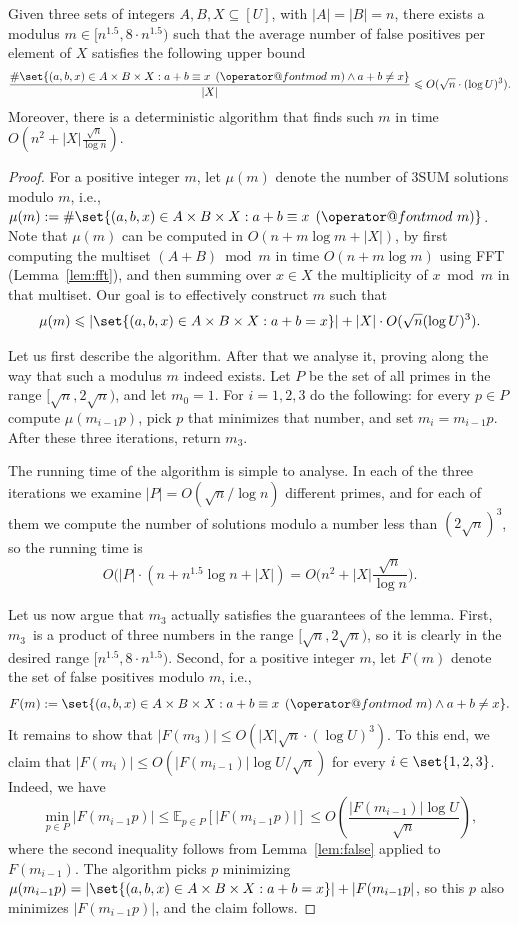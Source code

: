 \documentclass{theoretics}
\makeatletter
\newcommand{\E}{\mathbb{E}}
\newcommand{\tpmod}[1]{\mkern 8mu({\operator@font mod}\mkern 6mu#1)}
\makeatother
\begin{document}
\begin{lemma}
\label{lem:modulusselection}
Given three sets of integers $A, B, X \subseteq [U]$, with $|A|=|B|=n$, there exists a modulus $m \in [n^{1.5}, 8\cdot n^{1.5})$ such that the average number of false positives per element of $X$ satisfies the following upper bound
\[\frac{\#\set{(a,b,x) \in A \times B \times X : a + b \equiv x \tpmod{m} \land a + b \neq x}}{|X|} \leqslant O(\sqrt{n} \cdot (\log U)^3).\]
Moreover, there is a deterministic algorithm that finds such $m$ in time $O(n^2 + |X|\frac{\sqrt{n}}{\log n})$.
\end{lemma}

\begin{proof}
For a positive integer $m$, let $\mu(m)$ denote the number of 3SUM solutions modulo $m$, i.e.,
$\mu(m) := \#\set{(a,b,x) \in A \times B \times X : a + b \equiv x \tpmod{m}}$. 
Note that $\mu(m)$ can be computed in $O(n + m \log m + |X|)$, by first computing the multiset $(A+B) \bmod m$ in time $O(n + m \log m)$ using FFT (Lemma~\ref{lem:fft}), and then summing over $x \in X$ the multiplicity of $x \bmod m$ in that multiset.
Our goal is to effectively construct $m$ such that
\[\mu(m) \leqslant |\set{(a,b,x) \in A \times B \times X : a + b = x}| + |X| \cdot O(\sqrt{n} (\log U)^3).\]

Let us first describe the algorithm. After that we analyse it, proving along the way that such a modulus $m$ indeed exists. Let $P$ be the set of all primes in the range $[\sqrt{n}, 2\sqrt{n})$, and let $m_0 = 1$. For $i=1,2,3$ do the following: for every $p \in P$ compute $\mu(m_{i-1}p)$, pick $p$ that minimizes that number, and set $m_i = m_{i-1}p$. After these three iterations, return $m_3$.

The running time of the algorithm is simple to analyse. In each of the three iterations we examine $|P| = O(\sqrt{n} / \log n)$ different primes, and for each of them we compute the number of solutions modulo a number less than $(2\sqrt{n})^3$, so the running time is 
\[O(|P|\cdot(n + n^{1.5}\log n + |X|) = O\big(n^2+|X|\frac{\sqrt{n}}{\log n}\big).\]

Let us now argue that $m_3$ actually satisfies the guarantees of the lemma.
First, $m_3$~is a product of three numbers in the range $[\sqrt{n}, 2\sqrt{n})$, so it is clearly in the desired range $[n^{1.5}, 8 \cdot n^{1.5})$.
Second, for a positive integer $m$, let $F(m)$ denote the set of false positives modulo $m$, i.e.,
\[F(m) := \set{(a,b,x) \in A \times B \times X : a + b \equiv x \tpmod{m} \land a + b \neq x}.\]
It remains to show that $|F(m_3)| \leqslant O(|X|\sqrt{n}\cdot(\log U)^3)$.
To this end, we claim that $|F(m_i)| \leqslant O(|F(m_{i-1})| \log U / \sqrt{n})$ for every $i\in\set{1,2,3}$. Indeed, we have
\[ \min_{p \in P} |F(m_{i-1}p)|  \leqslant \E_{p \in P}[|F(m_{i-1}p)|] \leqslant O\left(\frac{|F(m_{i-1})| \log U}{\sqrt{n}}\right),\]
where the second inequality follows from Lemma~\ref{lem:false} applied to $F(m_{i-1})$. The algorithm picks $p$ minimizing $\mu(m_{i-1}p) = |\set{(a,b,x) \in A \times B \times X : a + b = x}| + |F(m_{i-1}p|$, so this $p$ also minimizes $|F(m_{i-1}p)|$, and the claim follows.


\end{proof}
\end{document}
